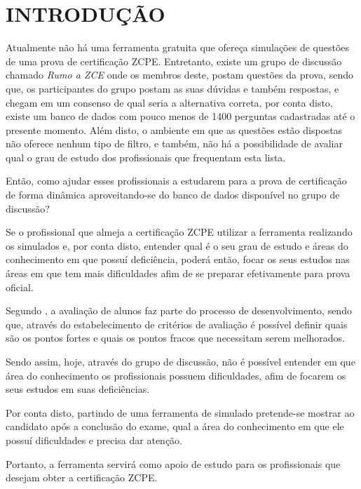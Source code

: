 \chapter{INTRODUÇÃO}
\label{chp:intro}

Atualmente não há uma ferramenta gratuita que ofereça simulações de questões de 
uma prova de certificação \ac{ZCPE}. Entretanto, existe um 
grupo de discussão chamado \textit{Rumo a ZCE} onde os membros deste, postam
questões da prova, sendo que, os participantes do grupo postam as suas dúvidas 
e também respostas, e chegam em um consenso de qual seria a alternativa correta,
por conta disto, existe um banco de dados com pouco menos de 1400 perguntas 
cadastradas até o presente momento. Além disto, o ambiente em que as questões 
estão dispostas não oferece nenhum tipo de filtro, e também, não há a 
possibilidade de avaliar qual o grau de estudo dos profissionais que frequentam 
esta lista.

Então, como ajudar esses profissionais a estudarem para a prova de certificação 
de forma dinâmica aproveitando-se do banco de dados disponível no grupo de 
discussão?


Se o profissional que almeja a certificação \acs{ZCPE} utilizar a ferramenta
realizando os simulados e, por conta disto, entender qual é o seu grau de estudo e áreas 
do conhecimento em que possuí deficiência, poderá então, focar os seus estudos 
nas áreas em que tem mais dificuldades afim de se preparar efetivamente para 
prova oficial.


Segundo , a avaliação de 
alunos faz parte do processo de desenvolvimento, sendo que, através do estabelecimento 
de critérios de avaliação é possível definir quais são os pontos fortes e quais
os pontos fracos que necessitam serem melhorados.

Sendo assim, hoje, através do grupo de discussão, não é possível entender em 
que área do conhecimento os profissionais possuem dificuldades, afim de focarem
os seus estudos em suas deficiências.

Por conta disto, partindo de uma ferramenta de simulado pretende-se mostrar ao
candidato após a conclusão do exame, qual a área do conhecimento em que ele 
possuí dificuldades e precisa dar atenção.

Portanto, a ferramenta servirá como apoio de
estudo para os profissionais que desejam obter a certificação \acs{ZCPE}.

